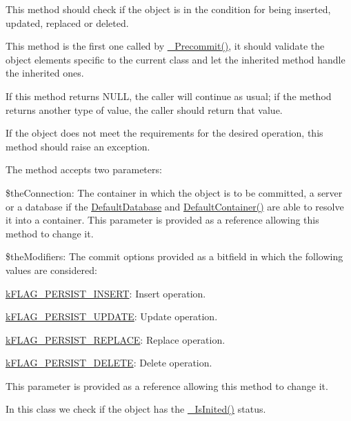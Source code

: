 This method should check if the object is in the condition for being inserted, updated, replaced or deleted.

This method is the first one called by \hyperlink{class_c_persistent_document_a23cfbb5ebf75e008622ab9e723472c70}{\-\_\-\-Precommit()}, it should validate the object elements specific to the current class and let the inherited method handle the inherited ones.

If this method returns {\ttfamily N\-U\-L\-L}, the caller will continue as usual; if the method returns another type of value, the caller should return that value.

If the object does not meet the requirements for the desired operation, this method should raise an exception.

The method accepts two parameters\-:


\begin{DoxyItemize}
\item {\ttfamily \$the\-Connection}\-: The container in which the object is to be committed, a server or a database if the \hyperlink{class_c_persistent_document_a6092e640e36485873b70a79db464e0ff}{Default\-Database} and \hyperlink{class_c_persistent_document_ada019252d242b5a88a26b82a18e29ed6}{Default\-Container()} are able to resolve it into a container. This parameter is provided as a reference allowing this method to change it. 
\item {\ttfamily \$the\-Modifiers}\-: The commit options provided as a bitfield in which the following values are considered\-: 
\begin{DoxyItemize}
\item {\ttfamily \hyperlink{}{k\-F\-L\-A\-G\-\_\-\-P\-E\-R\-S\-I\-S\-T\-\_\-\-I\-N\-S\-E\-R\-T}}\-: Insert operation. 
\item {\ttfamily \hyperlink{}{k\-F\-L\-A\-G\-\_\-\-P\-E\-R\-S\-I\-S\-T\-\_\-\-U\-P\-D\-A\-T\-E}}\-: Update operation. 
\item {\ttfamily \hyperlink{}{k\-F\-L\-A\-G\-\_\-\-P\-E\-R\-S\-I\-S\-T\-\_\-\-R\-E\-P\-L\-A\-C\-E}}\-: Replace operation. 
\item {\ttfamily \hyperlink{}{k\-F\-L\-A\-G\-\_\-\-P\-E\-R\-S\-I\-S\-T\-\_\-\-D\-E\-L\-E\-T\-E}}\-: Delete operation. 
\end{DoxyItemize}This parameter is provided as a reference allowing this method to change it. 
\end{DoxyItemize}

In this class we check if the object has the \hyperlink{class_c_status_document_a954dee06e219e0a0f2e7fa6edac56e28}{\-\_\-\-Is\-Inited()} status.


